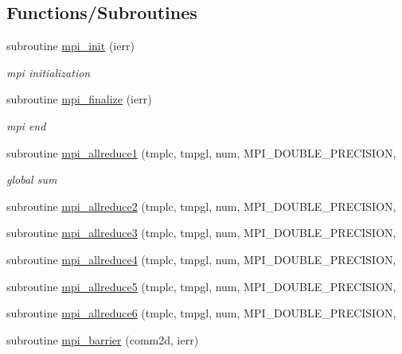 \subsection*{Functions/\+Subroutines}
\begin{DoxyCompactItemize}
\item 
subroutine \mbox{\hyperlink{namespacempistub_af6819ee02570b8c8bef94e79e67a4af9}{mpi\+\_\+init}} (ierr)
\begin{DoxyCompactList}\small\item\em mpi initialization \end{DoxyCompactList}\item 
subroutine \mbox{\hyperlink{namespacempistub_a6a6bc8ca0a832b3f53660407ed51302d}{mpi\+\_\+finalize}} (ierr)
\begin{DoxyCompactList}\small\item\em mpi end \end{DoxyCompactList}\item 
subroutine \mbox{\hyperlink{namespacempistub_a500688889ac1b249a828fab59a1f8b5e}{mpi\+\_\+allreduce1}} (tmplc, tmpgl, num, M\+P\+I\+\_\+\+D\+O\+U\+B\+L\+E\+\_\+\+P\+R\+E\+C\+I\+S\+I\+ON,
\begin{DoxyCompactList}\small\item\em global sum \end{DoxyCompactList}\item 
subroutine \mbox{\hyperlink{namespacempistub_a8d115cae5e65c2a2bc7679f25da7b08a}{mpi\+\_\+allreduce2}} (tmplc, tmpgl, num, M\+P\+I\+\_\+\+D\+O\+U\+B\+L\+E\+\_\+\+P\+R\+E\+C\+I\+S\+I\+ON,
\item 
subroutine \mbox{\hyperlink{namespacempistub_a4193e72879e62788a983d1c7e73ff08c}{mpi\+\_\+allreduce3}} (tmplc, tmpgl, num, M\+P\+I\+\_\+\+D\+O\+U\+B\+L\+E\+\_\+\+P\+R\+E\+C\+I\+S\+I\+ON,
\item 
subroutine \mbox{\hyperlink{namespacempistub_ad0b3b8a56320b07ec24fdf1a6d012614}{mpi\+\_\+allreduce4}} (tmplc, tmpgl, num, M\+P\+I\+\_\+\+D\+O\+U\+B\+L\+E\+\_\+\+P\+R\+E\+C\+I\+S\+I\+ON,
\item 
subroutine \mbox{\hyperlink{namespacempistub_a1d326fcb72261d5c91c9f31bfdeae961}{mpi\+\_\+allreduce5}} (tmplc, tmpgl, num, M\+P\+I\+\_\+\+D\+O\+U\+B\+L\+E\+\_\+\+P\+R\+E\+C\+I\+S\+I\+ON,
\item 
subroutine \mbox{\hyperlink{namespacempistub_a3a34d1b95074e43d0c79295326059ef2}{mpi\+\_\+allreduce6}} (tmplc, tmpgl, num, M\+P\+I\+\_\+\+D\+O\+U\+B\+L\+E\+\_\+\+P\+R\+E\+C\+I\+S\+I\+ON,
\item 
subroutine \mbox{\hyperlink{namespacempistub_a0d84064615f696d4877ad9f912d4cbef}{mpi\+\_\+barrier}} (comm2d, ierr)

\end{DoxyCompactItemize}
